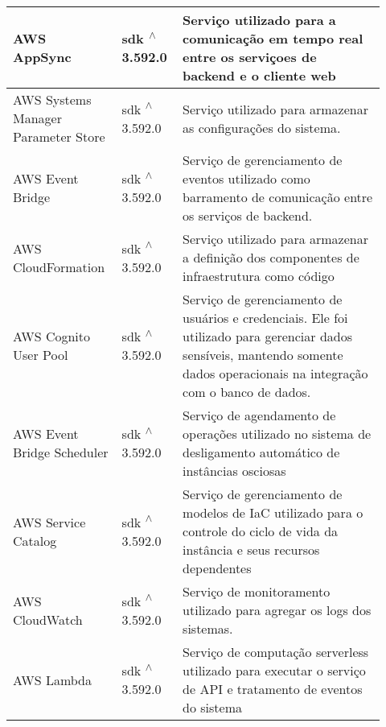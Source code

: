 \begin{longtable}{p{0.25\linewidth} p{0.15\linewidth} p{0.525\linewidth}}
\hline

AWS AppSync & sdk \textsuperscript{$\wedge$}3.592.0 & Serviço utilizado para a comunicação em tempo real entre os serviçoes de backend e o cliente web \\

\hline

AWS Systems Manager Parameter Store & sdk \textsuperscript{$\wedge$}3.592.0 & Serviço utilizado para armazenar as configurações do sistema. \\

\hline

AWS Event Bridge & sdk \textsuperscript{$\wedge$}3.592.0 & Serviço de gerenciamento de eventos utilizado como barramento de comunicação entre os serviços de backend. \\

\hline

AWS CloudFormation & sdk \textsuperscript{$\wedge$}3.592.0 & Serviço utilizado para armazenar a definição dos componentes de infraestrutura como código \\

\hline

AWS Cognito User Pool & sdk \textsuperscript{$\wedge$}3.592.0 & Serviço de gerenciamento de usuários e credenciais. Ele foi utilizado para gerenciar dados sensíveis, mantendo somente dados operacionais na integração com o banco de dados. \\

\hline

AWS Event Bridge Scheduler & sdk \textsuperscript{$\wedge$}3.592.0 & Serviço de agendamento de operações utilizado no sistema de desligamento automático de instâncias osciosas \\

\hline

AWS Service Catalog & sdk \textsuperscript{$\wedge$}3.592.0 & Serviço de gerenciamento de modelos de IaC utilizado para o controle do ciclo de vida da instância e seus recursos dependentes \\

\hline

AWS CloudWatch & sdk \textsuperscript{$\wedge$}3.592.0 & Serviço de monitoramento utilizado para agregar os logs dos sistemas. \\

\hline

AWS Lambda & sdk \textsuperscript{$\wedge$}3.592.0 & Serviço de computação serverless utilizado para executar o serviço de API e tratamento de eventos do sistema \\


\end{longtable}
